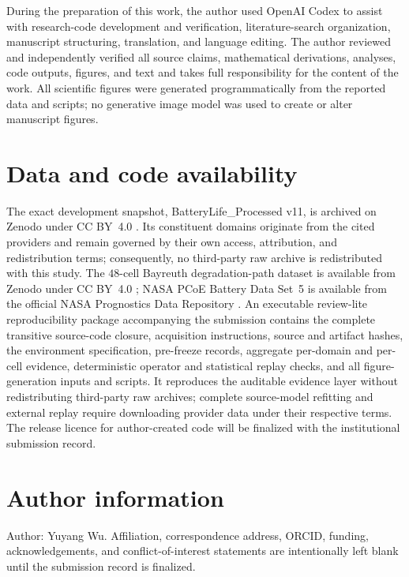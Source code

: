 \documentclass[11pt]{article}
\begin{document}
During the preparation of this work, the author used OpenAI Codex to assist with research-code development and verification, literature-search organization, manuscript structuring, translation, and language editing. The author reviewed and independently verified all source claims, mathematical derivations, analyses, code outputs, figures, and text and takes full responsibility for the content of the work. All scientific figures were generated programmatically from the reported data and scripts; no generative image model was used to create or alter manuscript figures.

\section*{Data and code availability}

The exact development snapshot, BatteryLife\_Processed v11, is archived on Zenodo under CC BY~4.0 \citep{batterylife2026processed}. Its constituent domains originate from the cited providers and remain governed by their own access, attribution, and redistribution terms; consequently, no third-party raw archive is redistributed with this study. The $48$-cell Bayreuth degradation-path dataset is available from Zenodo under CC BY~4.0 \citep{roder2025degradationdata}; NASA PCoE Battery Data Set~5 is available from the official NASA Prognostics Data Repository \citep{saha2007nasa}. An executable review-lite reproducibility package accompanying the submission contains the complete transitive source-code closure, acquisition instructions, source and artifact hashes, the environment specification, pre-freeze records, aggregate per-domain and per-cell evidence, deterministic operator and statistical replay checks, and all figure-generation inputs and scripts. It reproduces the auditable evidence layer without redistributing third-party raw archives; complete source-model refitting and external replay require downloading provider data under their respective terms. The release licence for author-created code will be finalized with the institutional submission record.

\section*{Author information}

Author: Yuyang Wu. Affiliation, correspondence address, ORCID, funding, acknowledgements, and conflict-of-interest statements are intentionally left blank until the submission record is finalized.

\begingroup
{}


\endgroup
\end{document}

